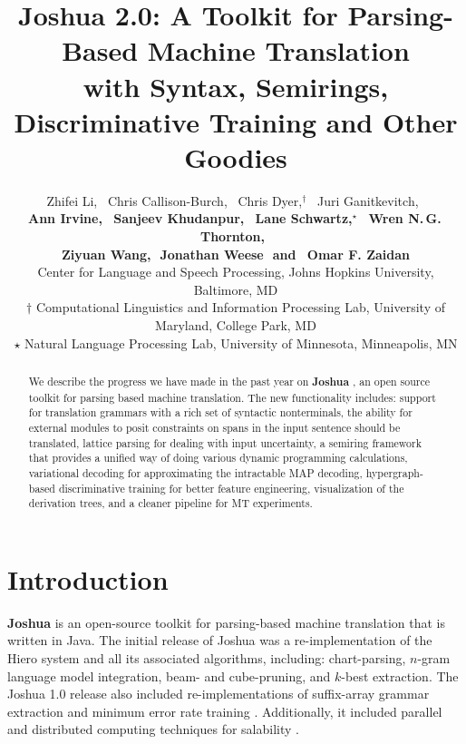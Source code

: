 \documentclass[11pt]{article}
\title{Joshua 2.0: A Toolkit for Parsing-Based Machine Translation \\with Syntax, Semirings, Discriminative Training and Other Goodies }
\author{
Zhifei Li,\,\,\,
Chris Callison-Burch,\,\,\,
Chris Dyer,$^\dagger$\,\,\,
Juri Ganitkevitch,\,\,\,
\\ {\bf
Ann Irvine,\,\,\,  
Sanjeev Khudanpur,\,\,\,
Lane Schwartz,$^\star$\,\,\, 
Wren N.\,G.\,Thornton,\,\,\,}
\\ {\bf
Ziyuan Wang,\,\,
Jonathan Weese\,\,
{\textnormal{and}}
\,\,\,Omar F. Zaidan
}\\
Center for Language and Speech Processing, Johns Hopkins University, Baltimore, MD\\
$\dagger$ Computational Linguistics and Information Processing Lab, University of Maryland, College Park, MD\\
$\star$ Natural Language Processing Lab, University of Minnesota, Minneapolis, MN }
\date{}
\begin{document}
\maketitle
\begin{abstract}
We describe the progress we have made in the past year on \textbf{Joshua} \cite{joshua-wmt09}, 
an open source toolkit for parsing based machine translation.
The new functionality includes: 
support for translation grammars with a rich set of syntactic nonterminals,
the ability for external modules to posit constraints on spans in the input sentence should be translated,  
lattice parsing for dealing with input uncertainty,
a semiring framework that provides a unified way of doing various dynamic programming calculations, 
variational decoding for approximating the intractable MAP decoding,
hypergraph-based discriminative training for better feature engineering, 
visualization of the derivation trees, 
and a cleaner pipeline for MT experiments.
\end{abstract}



\section{Introduction}

\textbf{Joshua} is an open-source toolkit for parsing-based machine translation that is written in Java. The initial release of Joshua  \cite{joshua-wmt09} was a re-implementation of the Hiero system \cite{hiero-2007} and all its associated algorithms, including: chart-parsing, $n$-gram language model integration, beam- and cube-pruning, and $k$-best extraction.  The Joshua 1.0 release also included re-implementations of suffix-array grammar extraction \cite{lopez:2007:EMNLP-CoNLL2007,PBML-2010-Joshua-grammar-extraction}  and minimum error rate training \cite{och-mert,Zaidan2009}.  Additionally, it included parallel and distributed computing techniques for salability \cite{Joshua-old}. 
\end{document}
